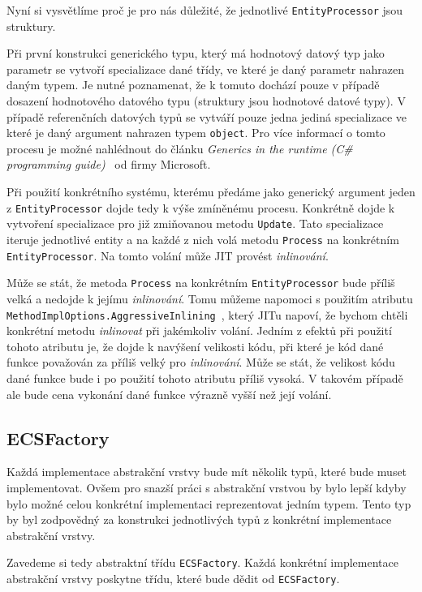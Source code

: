 Nyní si vysvětlíme proč je pro nás důležité, že jednotlivé \verb|EntityProcessor| jsou struktury.

Při první konstrukci generického typu, který má hodnotový datový typ jako parametr se vytvoří specializace dané třídy, ve které je daný parametr nahrazen daným typem. Je nutné poznamenat, že k tomuto dochází pouze v případě dosazení hodnotového datového typu (struktury jsou hodnotové datové typy). V případě referenčních datových typů se vytváří pouze jedna jediná specializace ve které je daný argument nahrazen typem \verb|object|. Pro více informací o tomto procesu je možné nahlédnout do článku \textit{Generics in the runtime (C\# programming guide)}~\cite{GenericsInTheRuntime} od firmy Microsoft.

Při použití konkrétního systému, kterému předáme jako generický argument jeden z \verb|EntityProcessor| dojde tedy k výše zmíněnému procesu. Konkrétně dojde k vytvoření specializace pro již zmiňovanou metodu \verb|Update|. Tato specializace iteruje jednotlivé entity a na každé z nich volá metodu \verb|Process| na konkrétním \verb|EntityProcessor|. Na tomto volání může JIT provést \textit{inlinování}.

Může se stát, že metoda \verb|Process| na konkrétním \verb|EntityProcessor| bude příliš velká a nedojde k jejímu \textit{inlinování}. Tomu můžeme napomoci s použitím atributu \verb|MethodImplOptions.AggressiveInlining|~\cite{MethodImplOptions}, který JITu napoví, že bychom chtěli konkrétní metodu \textit{inlinovat} při jakémkoliv volání. Jedním z efektů při použití tohoto atributu je, že dojde k navýšení velikosti kódu, při které je kód dané funkce považován za příliš velký pro \textit{inlinování}. Může se stát, že velikost kódu dané funkce bude i po použití tohoto atributu příliš vysoká. V takovém případě ale bude cena vykonání dané funkce výrazně vyšší než její volání. 

\subsection{ECSFactory}
Každá implementace abstrakční vrstvy bude mít několik typů, které bude muset implementovat. Ovšem pro snazší práci s abstrakční vrstvou by bylo lepší kdyby bylo možné celou konkrétní implementaci reprezentovat jedním typem. Tento typ by byl zodpovědný za konstrukci jednotlivých typů z konkrétní implementace abstrakční vrstvy.

Zavedeme si tedy abstraktní třídu \verb|ECSFactory|. Každá konkrétní implementace abstrakční vrstvy poskytne třídu, které bude dědit od \verb|ECSFactory|.

